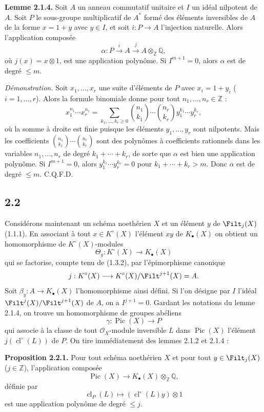 \documentclass[11pt]{article}
\newcommand{\cl}{\operatorname{cl}}
\providecommand{\Pic}{\operatorname{Pic}}
\begin{document}
\textbf{Lemme 2.1.4.} Soit $A$ un anneau commutatif unitaire et $I$ un idéal nilpotent de $A$. Soit $P$ le sous-groupe multiplicatif de $A^*$ formé des éléments inversibles de $A$ de la forme $x=1+y$ avec $y\in I$, et soit $i:P\to A$ l'injection naturelle. Alors l'application composée
\[
\alpha:P\xrightarrow{i}A\xrightarrow{j}A\otimes_{\mathbb Z}\mathbb Q,
\]
où $j(x)=x\otimes1$, est une application polynôme. Si $I^{m+1}=0$, alors $\alpha$ est de degré $\leq m$.

\emph{Démonstration.} Soit $x_1,\ldots,x_r$ une suite d'éléments de $P$ avec $x_i=1+y_i$ ($i=1,\ldots,r$). Alors la formule binomiale donne pour tout $n_1,\ldots,n_r\in\mathbb Z$ :
\begin{equation}\tag{2.1.5}
x_1^{n_1}\cdots x_r^{n_r}=
\sum_{k_1,\ldots,k_r\geq0}\binom{n_1}{k_1}\cdots\binom{n_r}{k_r}y_1^{k_1}\cdots y_r^{k_r},
\end{equation}
où la somme à droite est finie puisque les éléments $y_1,\ldots,y_r$ sont nilpotents. Mais les coefficients $\binom{n_1}{k_1}\cdots\binom{n_r}{k_r}$ sont des polynômes à coefficients rationnels dans les variables $n_1,\ldots,n_r$ de degré $k_1+\cdots+k_r$, de sorte que $\alpha$ est bien une application polynôme. Si $I^{m+1}=0$, alors $y_1^{k_1}\cdots y_r^{k_r}=0$ pour $k_1+\cdots+k_r>m$. Donc $\alpha$ est de degré $\leq m$. C.Q.F.D.

\subsection*{2.2}
Considérons maintenant un schéma noethérien $X$ et un élément $y$ de $\Filt_j(X)$ (1.1.1). En associant à tout $x\in K^\circ(X)$ l'élément $xy$ de $K_\bullet(X)$ on obtient un homomorphisme de $K^\circ(X)$-modules
\[
\Theta_y:K^\circ(X)\longrightarrow K_\bullet(X)
\]
qui se factorise, compte tenu de (1.3.2), par l'épimorphisme canonique
\[
j:K^\circ(X)\longrightarrow K^\circ(X)/\Filt^{j+1}(X)=A.
\]
Soit $\beta_y:A\to K_\bullet(X)$ l'homomorphisme ainsi défini. Si l'on désigne par $I$ l'idéal $\Filt^j(X)/\Filt^{j+1}(X)$ de $A$, on a $I^{j+1}=0$. Gardant les notations du lemme 2.1.4, on trouve un homomorphisme de groupes abéliens
\[
\gamma:\Pic(X)\longrightarrow P
\]
qui associe à la classe de tout $\mathcal O_X$-module inversible $L$ dans $\Pic(X)$ l'élément $j(\cl^\circ(L))$ de $P$. On tire immédiatement des lemmes 2.1.2 et 2.1.4 :

\textbf{Proposition 2.2.1.} Pour tout schéma noethérien $X$ et pour tout $y\in\Filt_j(X)$ ($j\in\mathbb Z$), l'application composée
\[
\Pic(X)\longrightarrow K_\bullet(X)\otimes_{\mathbb Z}\mathbb Q,
\]
définie par
\[
\cl_P(L)\longmapsto (\cl^\circ(L)y)\otimes1
\]
est une application polynôme de degré $\leq j$.
\end{document}
